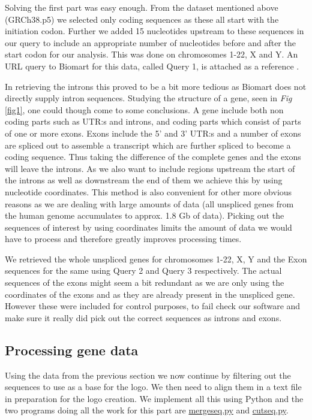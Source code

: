 \documentclass[10pt,letterpaper]{article}
\begin{document}
Solving the first part was easy enough. From the dataset mentioned above (GRCh38.p5) we selected only coding sequences as these all start with the initiation codon. Further we added 15 nucleotides upstream to these sequences in our query to include an appropriate number of nucleotides before and after the start codon for our analysis. This was done on chromosomes 1-22, X and Y. An URL query to Biomart for this data, called Query 1, is attached as a reference \cite{bib7}.

In retrieving the introns this proved to be a bit more tedious as Biomart does not directly supply intron sequences. Studying the structure of a gene, seen in \textit{Fig} \ref{fig1}, one could though come to some conclusions. A gene include both non coding parts such as UTR:s and introns, and coding parts which consist of parts of one or more exons. Exons include the 5' and 3' UTR:s and a number of exons are spliced out to assemble a transcript which are further spliced to become a coding sequence. Thus taking the difference of the complete genes and the exons will leave the introns. As we also want to include regions upstream the start of the introns as well as downstream the end of them we achieve this by using nucleotide coordinates. This method is also convenient for other more obvious reasons as we are dealing with large amounts of data (all unspliced genes from the human genome accumulates to approx. 1.8 Gb of data). Picking out the sequences of interest by using coordinates limits the amount of data we would have to process and therefore greatly improves processing times.

We retrieved the whole unspliced genes for chromosomes 1-22, X, Y and the Exon sequences for the same using Query 2 \cite{8} and Query 3 \cite{9} respectively. The actual sequences of the exons might seem a bit redundant as we are only using the coordinates of the exons and as they are already present in the unspliced gene. However these were included for control purposes, to fail check our software and make sure it really did pick out the correct sequences as introns and exons.

\subsection*{Processing gene data}
Using the data from the previous section we now continue by filtering out the sequences to use as a base for the logo. We then need to align them in a text file in preparation for the logo creation. We implement all this using Python and the two programs doing all the work for this part are \href{https://github.com/jolo2486/unravel_motifs/blob/master/bin/mergeseq.py}{mergeseq.py} and \href{https://github.com/jolo2486/unravel_motifs/blob/master/bin/cutseq.py}{cutseq.py}.
\end{document}
